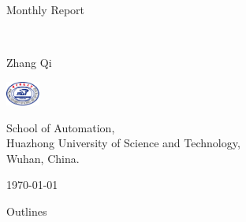 \documentclass[10pt]{beamer}
\begin{document}
\begin{frame}\label{Title}
    \vfill
    \centering
    \Huge
    Monthly Report\\
    \vspace{15pt}\\
    \begin{minipage}[m]{3cm}
        \Bold \small Zhang Qi
    \end{minipage}\hspace{-15pt}
    \begin{minipage}[m]{1.5cm}
        \centering
        \includegraphics[height=0.8cm]{Logos/HUSTLogoWithoutSubline.pdf}
    \end{minipage}
    \begin{minipage}[m]{0.55\textwidth}
        \Normal \scriptsize School of Automation,\\Huazhong University of Science and Technology,\\Wuhan, China.
    \end{minipage}
    \vfill
    \centering
    \today
\end{frame}

\begin{frame}[noframenumbering]{Outlines}\label{Outlines}
    \setcounter{tocdepth}{1}
    \tableofcontents %
\end{frame}

\end{document}
